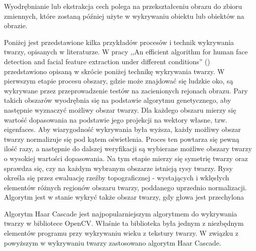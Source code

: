 \documentclass[a4paper,twoside,12pt]{book}
\begin{document}
    Wyodrębnianie lub ekstrakcja cech polega na przekształceniu obrazu do zbioru zmiennych, które
    zostaną później użyte w wykrywaniu obiektu lub obiektów na obrazie.


    Poniżej jest przedstawione kilka przykładów procesów
    i technik wykrywania twarzy, opisanych w literaturze.
    W pracy ,,An efficient algorithm for human face detection and facial
    feature extraction under different conditions'' (\cite{wongLamSiu})
    przedstawiono opisaną w skrócie poniżej technikę wykrywania twarzy.
    W pierwszym etapie procesu obszary, gdzie może znajdować się ludzkie oko,
    są wykrywane przez przeprowadzenie testów na zacienionych rejonach obrazu.
    Pary takich obszarów wyodrębnia się na podstawie algorytmu genetycznego,
    aby następnie wyznaczyć możliwy obszar twarzy.
    Dla każdego obszaru mierzy się wartość dopasowania na podstawie jego projekcji na wektory własne,
    tzw. eigenfaces.
    Aby wiarygodność wykrywania była wyższa,
    każdy możliwy obszar twarzy normalizuje się pod kątem oświetlenia.
    Proces ten powtarza się pewną ilość razy,
    a następnie do dalszej weryfikacji są wybierane możliwe obszary twarzy o wysokiej wartości dopasowania.
    Na tym etapie mierzy się symetrię twarzy oraz sprawdza się,
    czy na każdym wybranym obszarze istnieją rysy twarzy.
    Rysy określa się przez ewaluację rzeźby topograficznej - wystających i wklęsłych elementów
    różnych regionów obszaru twarzy, poddanego uprzednio normalizacji.
    Algorytm jest w stanie wykryć także obszar twarzy, gdy głowa jest przechylona



    Algorytm Haar Cascade jest najpopularniejszym algorytmem do wykrywania twarzy w bibliotece OpenCV. Właśnie ta
    biblioteka była jednym z niezbędnym elementów programu przy wykrywaniu wieku z tekstury twarzy.
    W związku z powyższym w wykrywaniu twarzy zastosowano algorytm Haar Cascade.

\end{document}
